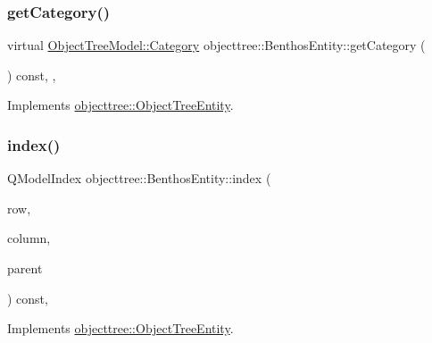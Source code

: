\mbox{\label{classobjecttree_1_1_benthos_entity_ab067e241be1ead62dbd759859567dc21}} 
\subsubsection{\texorpdfstring{getCategory()}{getCategory()}}
{\footnotesize\ttfamily virtual \mbox{\hyperlink{class_object_tree_model_a379e9d6b0d381853785adf62095ba4e3}{Object\+Tree\+Model\+::\+Category}} objecttree\+::\+Benthos\+Entity\+::get\+Category (\begin{DoxyParamCaption}{ }\end{DoxyParamCaption}) const\hspace{0.3cm}{\ttfamily [inline]}, {\ttfamily [override]}, {\ttfamily [virtual]}}



Implements \mbox{\hyperlink{classobjecttree_1_1_object_tree_entity_aa4e80e7fa80672c1b9902add665abc77}{objecttree\+::\+Object\+Tree\+Entity}}.

\mbox{\label{classobjecttree_1_1_benthos_entity_aa6fee60ab1e162af5925f7662a5e51fd}} 
\subsubsection{\texorpdfstring{index()}{index()}}
{\footnotesize\ttfamily Q\+Model\+Index objecttree\+::\+Benthos\+Entity\+::index (\begin{DoxyParamCaption}\item[{int}]{row,  }\item[{int}]{column,  }\item[{const Q\+Model\+Index \&}]{parent }\end{DoxyParamCaption}) const\hspace{0.3cm}{\ttfamily [override]}, {\ttfamily [virtual]}}



Implements \mbox{\hyperlink{classobjecttree_1_1_object_tree_entity_a9ccaab3b27e65b1ed8b22f00c57a1082}{objecttree\+::\+Object\+Tree\+Entity}}.

